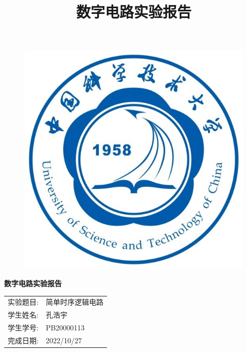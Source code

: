 \documentclass{article}
\title{\heiti 数字电路实验报告 }
\begin{document}
	\vspace*{1cm}
	
	\begin{figure}[h]
		\centering
		\includegraphics[scale=1.0]{xh.jpg}
	\end{figure}

	\vspace*{0.5cm}
	
	\begin{center}
		\Huge{\textbf{数字电路实验报告}}
	\end{center}
	
	\vspace{5cm}
	
	\begin{table}[h]
		\centering
		\begin{Large}
			\begin{tabular}{p{3cm} p{7cm}<{\centering}}
				实验题目: &  简单时序逻辑电路     \\ \cline{2-2}
				学生姓名:      & 孔浩宇   \\ \cline{2-2}
				学生学号: & PB20000113 \\ \cline{2-2}
				完成日期:       & 2022/10/27 \\ \cline{2-2}
			\end{tabular}
		\end{Large}		
	\end{table}
	\newpage
\end{document}
